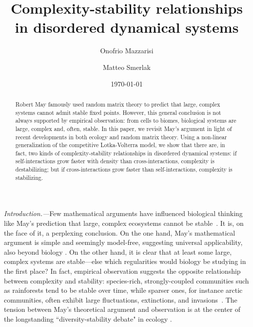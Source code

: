 \documentclass[
 prl,
 twocolumn,
 amsmath,
 amssymb,
 aps,
]{revtex4-2}
\begin{document}
\title{Complexity-stability relationships in disordered dynamical systems}

\author{Onofrio Mazzarisi}

\author{Matteo Smerlak}


\date{\today}

\begin{abstract}
    Robert May famously used random matrix theory to predict that large, complex systems cannot admit stable fixed points. 
    However, this general conclusion is not always supported by empirical observation: from cells to biomes, biological systems are large, complex and, often, stable.
    In this paper, we revisit May's argument in light of recent developments in both ecology and random matrix theory. 
    Using a non-linear generalization of the competitive Lotka-Volterra model, we show that there are, in fact, two kinds of complexity-stability relationships in disordered dynamical systems:
    if self-interactions grow faster with density than cross-interactions, complexity is destabilizing; but if cross-interactions grow faster than self-interactions, complexity is stabilizing.
\end{abstract}

\maketitle

\paragraph*{}
\emph{Introduction.---}Few mathematical arguments have influenced biological thinking like May's prediction that large, complex ecosystems cannot be stable~\cite{May1972}.
It is, on the face of it, a perplexing conclusion.
On the one hand, May's mathematical argument is simple and seemingly model-free, suggesting universal applicability, also beyond biology \cite{Haldane2011, Moran2019}.
On the other hand, it is clear that at least some large, complex systems are stable---else which regularities would biology be studying in the first place? 
In fact, empirical observation suggests the opposite relationship between complexity and stability: species-rich, strongly-coupled communities such as rainforests tend to be stable over time, while sparser ones, for instance arctic communities, often exhibit large fluctuations, extinctions, and invasions~\cite{Hutchinson1959,Odum1959,MacArthur1955}. 
The tension between May's theoretical argument and observation is at the center of the longstanding ``diversity-stability debate" in ecology \cite{McCann2000, Loreau2022}.
\end{document}
